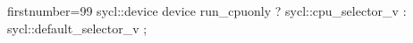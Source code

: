 \begin{cppcode*}{firstnumber=99}
        sycl::device device { run_cpuonly ? sycl::cpu_selector_v : sycl::default_selector_v };
\end{cppcode*}
